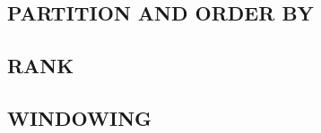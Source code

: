 \subsection{PARTITION AND ORDER BY}
\label{sec:olap.partition_by_and_order_by}

\subsection{RANK}
\label{sec:olap.rank}


\subsection{WINDOWING}
\label{sec:olap.windowing}
